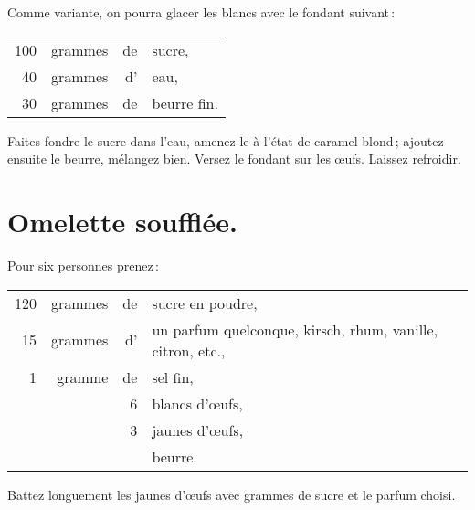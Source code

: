 Comme variante, on pourra glacer les blancs avec le fondant suivant :

\footnotesize
\begin{longtable}{rrrp{16em}}
    100 & grammes & de & sucre,                                                                           \\
     40 & grammes & d' & eau,                                                                             \\
     30 & grammes & de & beurre fin.                                                                      \\
\end{longtable}
\normalsize

Faites fondre le sucre dans l'eau, amenez-le à l'état de caramel blond ;
ajoutez ensuite le beurre, mélangez bien. Versez le fondant sur les œufs.
Laissez refroidir.

\section*{\centering Omelette soufflée.}
{}

Pour six personnes prenez :

\footnotesize
\begin{longtable}{rrrp{16em}}
    120 & grammes & de & sucre en poudre,                                                                 \\
     15 & grammes & d' & un parfum quelconque, kirsch, rhum, vanille, citron, etc.,                       \\
      1 & gramme  & de & sel fin,                                                                         \\
        &         &  6 & blancs d'œufs,                                                                   \\
        &         &  3 & jaunes d'œufs,                                                                   \\
        &         &    &  beurre.                                                                         \\
\end{longtable}
\normalsize

Battez longuement les jaunes d'œufs avec {\mmm} grammes de sucre et le
parfum choisi.

